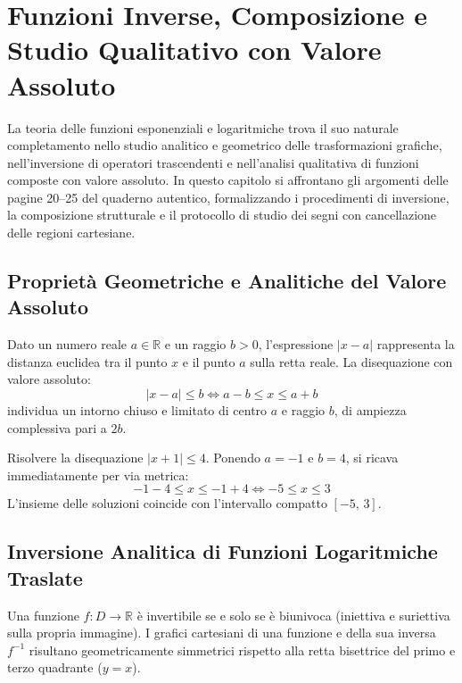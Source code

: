 \documentclass[11pt,a4paper,oneside]{report}
\begin{document}
\chapter{Funzioni Inverse, Composizione e Studio Qualitativo con Valore Assoluto}

La teoria delle funzioni esponenziali e logaritmiche trova il suo naturale completamento nello studio analitico e geometrico delle trasformazioni grafiche, nell'inversione di operatori trascendenti e nell'analisi qualitativa di funzioni composte con valore assoluto. In questo capitolo si affrontano gli argomenti delle pagine 20--25 del quaderno autentico, formalizzando i procedimenti di inversione, la composizione strutturale e il protocollo di studio dei segni con cancellazione delle regioni cartesiane.

\section{Propriet\`a Geometriche e Analitiche del Valore Assoluto}

\begin{definizione}
Dato un numero reale $a \in \mathbb{R}$ e un raggio $b > 0$, l'espressione $|x - a|$ rappresenta la distanza euclidea tra il punto $x$ e il punto $a$ sulla retta reale. La disequazione con valore assoluto:
\begin{equation}
|x - a| \le b \iff a - b \le x \le a + b
\end{equation}
individua un intorno chiuso e limitato di centro $a$ e raggio $b$, di ampiezza complessiva pari a $2b$.
\end{definizione}

\begin{esempio}
Risolvere la disequazione $|x + 1| \le 4$.
Ponendo $a = -1$ e $b = 4$, si ricava immediatamente per via metrica:
\begin{equation}
-1 - 4 \le x \le -1 + 4 \iff -5 \le x \le 3
\end{equation}
L'insieme delle soluzioni coincide con l'intervallo compatto $[-5, \, 3]$.
\end{esempio}

\section{Inversione Analitica di Funzioni Logaritmiche Traslate}

Una funzione $f \colon D \to \mathbb{R}$ \`e invertibile se e solo se \`e biunivoca (iniettiva e suriettiva sulla propria immagine). I grafici cartesiani di una funzione e della sua inversa $f^{-1}$ risultano geometricamente simmetrici rispetto alla retta bisettrice del primo e terzo quadrante ($y = x$).
\end{document}
